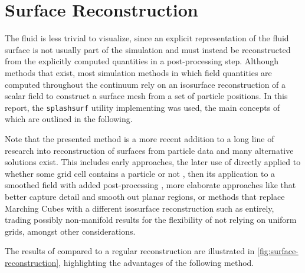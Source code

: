 \documentclass[oneside, a4paper]{book}
\begin{document}
  \section{Surface Reconstruction}\label{sec:surface-reconstruction}
  The fluid is less trivial to visualize, since an explicit representation of the fluid surface is not usually part of the simulation and must instead be reconstructed from the explicitly computed quantities in a post-processing step. Although methods that \autocite[explicitly operate on a surface representation]{surface-only-fluids} exist, most simulation methods in which field quantities are computed throughout the continuum rely on an isosurface reconstruction of a scalar field to construct a surface mesh from a set of particle positions. In this report, the \texttt{splashsurf} utility implementing \autocite[Weighted Laplacian Smoothing for Surface Recontruction]{laplacian-surf-reconst} was used, the main concepts of which are outlined in the following. 
  
  Note that the presented method is a more recent addition to a long line of research into reconstruction of surfaces from particle data and many alternative solutions exist. This includes early \autocite[implicit, Gaussian point-splatting]{blinn-blobbies} approaches, the later use of \autocite[Marching Cubes]{marching-cubes} directly applied to whether some grid cell contains a particle or not \autocite{müller-2003}, then its application to a smoothed field with added post-processing \autocite{sand-fluid-zhu-bridson}, more elaborate approaches like \autocite[anisotropic kernels]{surface-reconstr-anisotropic} that better capture detail and smooth out planar regions, or methods that replace Marching Cubes with a different isosurface reconstruction such as \autocite[dual contouring]{dual-contouring-hermite} entirely, trading possibly non-manifold results for the flexibility of not relying on uniform grids, amongst other considerations.

  The results of \autocite[Weighted Laplacian Smoothing]{laplacian-surf-reconst} compared to a regular \autocite[Marching Cubes]{marching-cubes} reconstruction are illustrated in \autoref{fig:surface-reconstruction}, highlighting the advantages of the following method.
\end{document}
